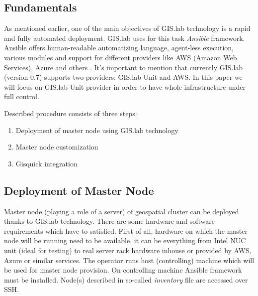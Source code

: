 \documentclass{isprs}
\begin{document}
\subsection{Fundamentals}

As mentioned earlier, one of the main objectives of GIS.lab technology
is a rapid and fully automated deployment. GIS.lab uses for this task
\textit{Ansible} framework. Ansible offers human-readable automatizing
language, agent-less execution, various modules and support for
different providers like AWS (Amazon Web Services), Azure and others
\cite{hochstein2014ansible}. It's important to mention that currently
GIS.lab (version 0.7) supports two providers: GIS.lab Unit and AWS. In
this paper we will focus on GIS.lab Unit provider in order to have
whole infrastructure under full control.

Described procedure consists of three steps:

\begin{enumerate}
\setlength\itemsep{0em}\setlength\parskip{0em}\setlength\topsep{0em}\setlength\partopsep{0em}\setlength\parsep{0em}
\item{Deployment of master node using GIS.lab technology} 
\item{Master node customization}
\item{Gisquick integration}
\end{enumerate}

\subsection{Deployment of Master Node}\label{Deployment of Master Node}

Master node (playing a role of a server) of geospatial cluster can be
deployed thanks to GIS.lab technology. There are some hardware and
software requirements which have to satisfied. First of all, hardware
on which the master node will be running need to be available, it can
be everything from Intel NUC unit (ideal for testing) to real server
rack hardware inhouse or provided by AWS, Azure or similar
services. The operator runs host (controlling) machine which will be
used for master node provision. On controlling machine Ansible
framework must be installed. Node(s) described in so-called
\textit{inventory} file are accessed over SSH.
\end{document}
